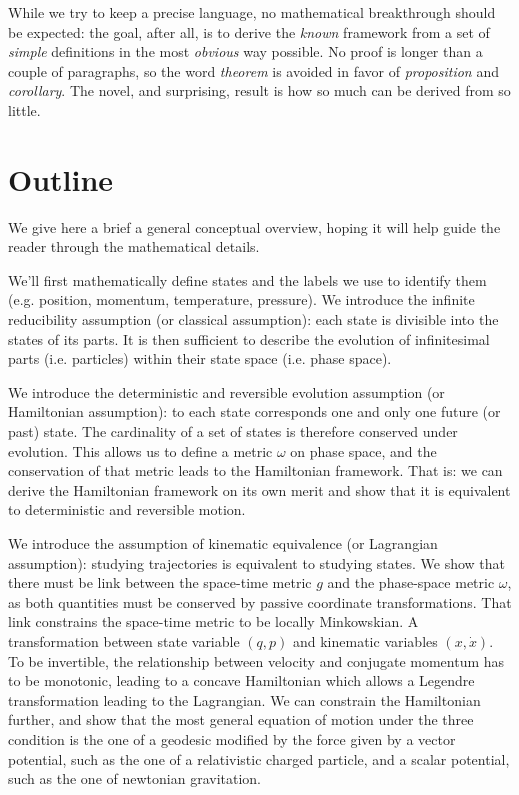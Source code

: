 \documentclass[aps,pra,10pt,twocolumn,floatfix,nofootinbib]{revtex4-1}
\theoremstyle{definition}
\begin{document}
While we try to keep a precise language, no mathematical breakthrough should be expected: the goal, after all, is to derive the \emph{known} framework from a set of \emph{simple} definitions in the most \emph{obvious} way possible. No proof is longer than a couple of paragraphs, so the word \emph{theorem} is avoided in favor of \emph{proposition} and \emph{corollary}. The novel, and surprising, result is how so much can be derived from so little.

\section{Outline}

We give here a brief a general conceptual overview, hoping it will help guide the reader through the mathematical details.

We'll first mathematically define states and the labels we use to identify them (e.g. position, momentum, temperature, pressure). We introduce the infinite reducibility assumption (or classical assumption): each state is divisible into the states of its parts. It is then sufficient to describe the evolution of infinitesimal parts (i.e. particles) within their state space (i.e. phase space).

We introduce the deterministic and reversible evolution assumption (or Hamiltonian assumption): to each state corresponds one and only one future (or past) state. The cardinality of a set of states is therefore conserved under evolution. This allows us to define a metric $\omega$ on phase space, and the conservation of that metric leads to the Hamiltonian framework. That is: we can derive the Hamiltonian framework on its own merit and show that it is equivalent to deterministic and reversible motion.

We introduce the assumption of kinematic equivalence (or Lagrangian assumption): studying trajectories is equivalent to studying states. We show that there must be link between the space-time metric $g$ and the phase-space metric $\omega$, as both quantities must be conserved by passive coordinate transformations. That link constrains the space-time metric to be locally Minkowskian. A transformation between state variable $(q, p)$ and kinematic variables $(x, \dot{x})$.  To be invertible, the relationship between velocity and conjugate momentum has to be monotonic, leading to a concave Hamiltonian which allows a Legendre transformation leading to the Lagrangian. We can constrain the Hamiltonian further, and show that the most general equation of motion under the three condition is the one of a geodesic modified by the force given by a vector potential, such as the one of a relativistic charged particle, and a scalar potential, such as the one of newtonian gravitation.
\end{document}
